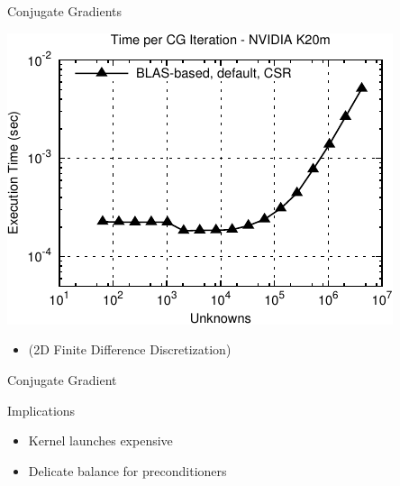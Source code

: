 \begin{frame}[fragile]{Conjugate Gradients}

 \begin{block}{}
 
 \begin{center}
  \vspace*{-0.5cm}
  \includegraphics[width=0.85\textwidth]{figures/cg-k20m-0}
 \end{center}

 \begin{itemize}
  \item   \vspace*{-0.3cm} {\small (2D Finite Difference Discretization)}
 \end{itemize}

 \end{block}
   
\end{frame}



\begin{frame}[fragile]{Conjugate Gradient}

 \begin{block}{Implications}
   \begin{itemize}
   \item Kernel launches expensive
   \item Delicate balance for preconditioners
  \end{itemize}
  
  \vspace*{6.1cm}
  \end{block}
   
\end{frame}

